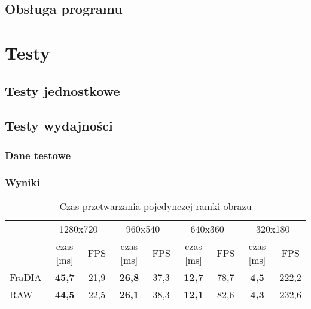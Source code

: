 \documentclass[a4paper,12pt]{article}
\begin{document}
\subsection{Obsługa programu}

\section{Testy}

\subsection{Testy jednostkowe}

\subsection{Testy wydajności}

\subsubsection{Dane testowe}
\subsubsection{Wyniki}







\begin{table}[h!]
\caption[Zadanie pierwsze -- czas przetwarzania pojedynczej ramki obrazu]{Czas przetwarzania pojedynczej ramki obrazu}
\centering
\begin{tabular}{lcccccccc}
\toprule
 & \multicolumn{2}{c}{1280x720} & \multicolumn{2}{c}{960x540} & \multicolumn{2}{c}{640x360} & \multicolumn{2}{c}{320x180} \\
\cmidrule(r){2-9}
 & czas [ms] & FPS & czas [ms] & FPS & czas [ms] & FPS & czas [ms] & FPS \\
\midrule
FraDIA & \bf 45,7 & 21,9 & \bf 26,8 & 37,3 & \bf 12,7 & 78,7 & \bf 4,5 & 222,2 \\
RAW    & \bf 44,5 & 22,5 & \bf 26,1 & 38,3 & \bf 12,1 & 82,6 & \bf 4,3 & 232,6 \\
\bottomrule
\end{tabular}
\label{tab:zad_1_wyniki}
\end{table}
\end{document}
